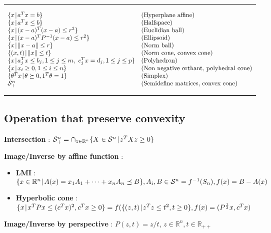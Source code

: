 \documentclass[a4paper, 10pt]{article}
\newcommand{\rline}{\vspace{0em}\noindent\rule{\textwidth}{1pt}\vspace{0em}}
\newcommand{\norm}[1]{\|#1\|}
\newcommand{\set}[2]{\{ #1 \hspace{.1em} | \hspace{.1em}#2 \}}
\newcommand{\Rpp}{\mathbb{R}_{++}}
\newcommand{\Rn}{\mathbb{R}^n}
\newcommand{\Sn}{\mathcal{S}^n}
\newcommand{\Snp}{\mathcal{S}_{+}^n}
\newcommand{\itm}[1]{{\color{itmcolor} \textbf{#1}}}
\begin{document}
\rline
\vspace{-1em}
\begin{equation*}
  \begin{array}{ll}
    \set{x}{a^T x = b} & \text{(Hyperplane affine)} \\
    \set{x}{a^T x \le b} & \text{(Halfspace)} \\
    \set{x}{(x - a)^T (x - a) \le r^2} & \text{(Euclidian ball)} \\
    \set{x}{(x - a)^T P^{-1}(x - a) \le r^2} & \text{(Ellipsoid)} \\
    \set{x}{\norm{x - a} \le r} & \text{(Norm ball)} \\
    \set{(x, t)}{\norm{x} \le t} & \text{(Norm cone, convex cone)} \\
    \set{x}{a_j^T x \le b_j, 1 \le j \le m,\ c_j^T x = d_j, 1 \le j \le p} & \text{(Polyhedron)} \\
    \set{x}{x_i \ge 0, 1 \le i \le n} & \text{(Non negative orthant, polyhedral cone)} \\
    \set{\theta^T x}{\theta \succeq 0, 1^T \theta = 1} & \text{(Simplex)} \\
    \Snp & \text{(Semidefine matrices, convex cone)} \\
  \end{array}
\end{equation*}
\rline


\subsection{Operation that preserve convexity}

\itm{Intersection} : $\Snp = \cap_{z \in \Rn}\set{X \in \Sn}{z^T X z \ge 0}$

\itm{Image/Inverse by affine function} :

\begin{itemize}
\item \itm{LMI} :
  $\set{x \in \Rn}{A(x) = x_1 A_1 + \dots + x_n A_n \preceq B}, A_i, B
  \in \Sn = f^{-1}(S_n), f(x) = B - A(x)$
\item \itm{Hyperbolic cone} :
  $\set{x}{x^T P x \le (c^T x)^2, c^T x \ge 0} = f(\set{(z, t)}{z^T z
    \le t^2, t \ge 0}, f(x) = (P^{\frac{1}{2}}x, c^T x)$
\end{itemize}
\itm{Image/Inverse by perspective} : $P(z, t) = z / t$, $z \in \Rn, t \in \Rpp$
\end{document}
